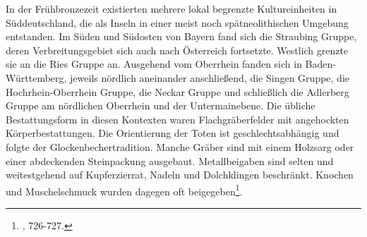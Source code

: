 \documentclass[openany,twoside,twocolumn]{book}
\let\rmarkdownfootnote\footnote%
\def\footnote{\protect\rmarkdownfootnote}
\begin{document}
In der Frühbronzezeit existierten mehrere lokal begrenzte
Kultureinheiten in Süddeutschland, die als Inseln in einer meist noch
spätneolithischen Umgebung entstanden. Im Süden und Südosten von Bayern
fand sich die Straubing Gruppe, deren Verbreitungsgebiet sich auch nach
Österreich fortsetzte. Westlich grenzte sie an die Ries Gruppe an.
Ausgehend vom Oberrhein fanden sich in Baden-Württemberg, jeweils
nördlich aneinander anschließend, die Singen Gruppe, die
Hochrhein-Oberrhein Gruppe, die Neckar Gruppe und schließlich die
Adlerberg Gruppe am nördlichen Oberrhein und der Untermainebene. Die
übliche Bestattungsform in diesen Kontexten waren Flachgräberfelder mit
angehockten Körperbestattungen. Die Orientierung der Toten ist
geschlechtsabhängig und folgte der Glockenbechertradition. Manche Gräber
sind mit einem Holzsarg oder einer abdeckenden Steinpackung ausgebaut.
Metallbeigaben sind selten und weitestgehend auf Kupferzierrat, Nadeln
und Dolchklingen beschränkt. Knochen und Muschelschmuck wurden dagegen
oft beigegeben\footnote{\textcite{jockenhovel_germany_2013}, 726-727.}.
\end{document}
